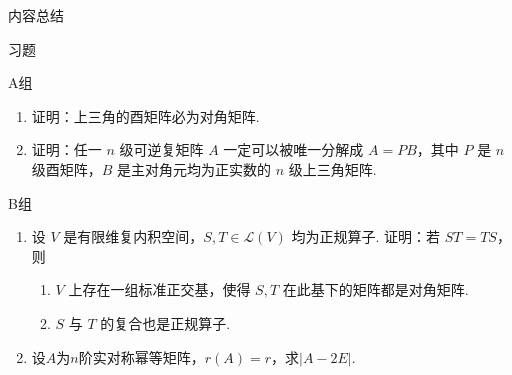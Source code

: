 



\vspace{2ex}
\centerline{\heiti \Large 内容总结}

\vspace{2ex}
\centerline{\heiti \Large 习题}

\vspace{2ex}
{\kaishu }
\begin{flushright}
    \kaishu

\end{flushright}

\centerline{\heiti A组}
\begin{enumerate}
    \item 证明：上三角的酉矩阵必为对角矩阵.

    \item 证明：任一 $ n $ 级可逆复矩阵 $ A $ 一定可以被唯一分解成 $ A = PB $，其中 $ P $ 是 $ n $ 级酉矩阵，$ B $ 是主对角元均为正实数的 $ n $ 级上三角矩阵.
\end{enumerate}

\centerline{\heiti B组}
\begin{enumerate}
    \item 设 $ V $ 是有限维复内积空间，$ S, T \in \mathcal{L}(V) $ 均为正规算子. 证明：若 $ ST = TS $，则
          \begin{enumerate}
              \item $ V $ 上存在一组标准正交基，使得 $ S, T $ 在此基下的矩阵都是对角矩阵.

              \item $ S $ 与 $ T $ 的复合也是正规算子.
          \end{enumerate}

    \item 设$A$为$n$阶实对称幂等矩阵，$r(A)=r$，求$|A-2E|$.
\end{enumerate}

